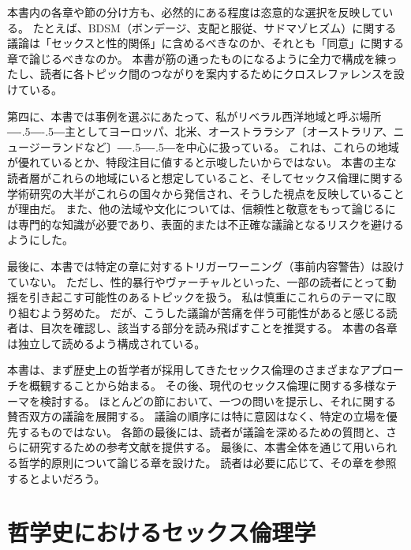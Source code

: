 \documentclass[paper=a4,book,openany]{jlreq}
\def\DDASH{―\kern-.5\zw―\kern-.5\zw―} %
\begin{document}
本書内の各章や節の分け方も、必然的にある程度は恣意的な選択を反映している。
たとえば、BDSM（ボンデージ、支配と服従、サドマゾヒズム）に関する議論は「セックスと性的関係」に含めるべきなのか、それとも「同意」に関する章で論じるべきなのか。
本書が筋の通ったものになるように全力で構成を練ったし、読者に各トピック間のつながりを案内するためにクロスレファレンスを設けている。

第四に、本書では事例を選ぶにあたって、私がリベラル西洋地域と呼ぶ場所{\DDASH}主としてヨーロッパ、北米、オーストララシア〔オーストラリア、ニュージーランドなど〕{\DDASH}を中心に扱っている。
これは、これらの地域が優れているとか、特段注目に値すると示唆したいからではない。
本書の主な読者層がこれらの地域にいると想定していること、そしてセックス倫理に関する学術研究の大半がこれらの国々から発信され、そうした視点を反映していることが理由だ。
また、他の法域や文化については、信頼性と敬意をもって論じるには専門的な知識が必要であり、表面的または不正確な議論となるリスクを避けるようにした。

最後に、本書では特定の章に対するトリガーワーニング（事前内容警告）は設けていない。
ただし、性的暴行やヴァーチャルといった、一部の読者にとって動揺を引き起こす可能性のあるトピックを扱う。
私は慎重にこれらのテーマに取り組むよう努めた。
だが、こうした議論が苦痛を伴う可能性があると感じる読者は、目次を確認し、該当する部分を読み飛ばすことを推奨する。
本書の各章は独立して読めるよう構成されている。

本書は、まず歴史上の哲学者が採用してきたセックス倫理のさまざまなアプローチを概観することから始まる。
その後、現代のセックス倫理に関する多様なテーマを検討する。
ほとんどの節において、一つの問いを提示し、それに関する賛否双方の議論を展開する。
議論の順序には特に意図はなく、特定の立場を優先するものではない。
各節の最後には、読者が議論を深めるための質問と、さらに研究するための参考文献を提供する。
最後に、本書全体を通じて用いられる哲学的原則について論じる章を設けた。
読者は必要に応じて、その章を参照するとよいだろう。

\chapter{哲学史におけるセックス倫理学}
\end{document}
